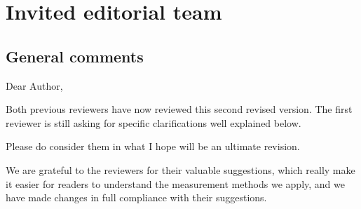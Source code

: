 \section*{Invited editorial team}\label{editor}

\subsection*{General comments}
\RC{} Dear Author,


\RC*{} Both previous reviewers have now reviewed this second revised version. The first reviewer is still asking for specific clarifications well explained below.

\RC*{} Please do consider them in what I hope will be an ultimate revision.

\AR{} We are grateful to the reviewers for their valuable suggestions, which really make it easier for readers to understand the measurement methods we apply, and we have made changes in full compliance with their suggestions.

